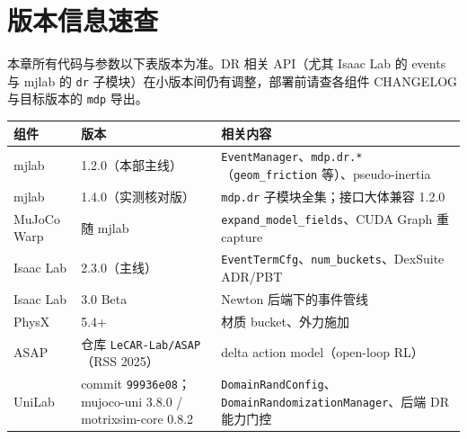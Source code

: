\section*{版本信息速查}
\label{sec:rlmc-dr-versions}

本章所有代码与参数以下表版本为准。DR 相关 API（尤其 Isaac Lab 的 events 与 mjlab 的 \verb|dr| 子模块）在小版本间仍有调整，部署前请查各组件 CHANGELOG 与目标版本的 \verb|mdp| 导出。

\begin{center}
\small
\begin{tabular}{@{}lll@{}}
\toprule
组件 & 版本 & 相关内容 \\
\midrule
mjlab & 1.2.0（本部主线） & \verb|EventManager|、\verb|mdp.dr.*|（\verb|geom_friction| 等）、pseudo-inertia \\
mjlab & 1.4.0（实测核对版） & \verb|mdp.dr| 子模块全集；接口大体兼容 1.2.0 \\
MuJoCo Warp & 随 mjlab & \verb|expand_model_fields|、CUDA Graph 重 capture \\
Isaac Lab & 2.3.0（主线） & \verb|EventTermCfg|、\verb|num_buckets|、DexSuite ADR/PBT \\
Isaac Lab & 3.0 Beta & Newton 后端下的事件管线 \\
PhysX & 5.4+ & 材质 bucket、外力施加 \\
ASAP & 仓库 \verb|LeCAR-Lab/ASAP|（RSS 2025） & delta action model（open-loop RL） \\
UniLab & commit \verb|99936e08|；mujoco-uni 3.8.0 / motrixsim-core 0.8.2 & \verb|DomainRandConfig|、\verb|DomainRandomizationManager|、后端 DR 能力门控 \\
\bottomrule
\end{tabular}
\end{center}
